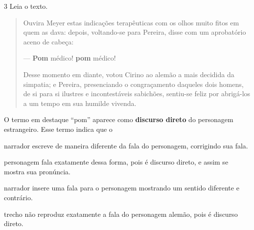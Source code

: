 \num{3} Leia o texto.

\begin{quote}
Ouvira Meyer estas indicações terapêuticas com os olhos muito fitos em
quem as dava: depois, voltando-se para Pereira, disse com um aprobatório
aceno de cabeça:

--- \textbf{Pom} médico! \textbf{pom} médico!

Desse momento em diante, votou Cirino ao alemão a mais decidida da
simpatia; e Pereira, presenciando o congraçamento daqueles dois homens,
de si para si ilustres e incontestáveis sabichões, sentiu-se feliz por
abrigá-los a um tempo em sua humilde vivenda.

\end{quote}

O termo em destaque “pom” aparece como \textbf{discurso direto} do
personagem estrangeiro. Esse termo indica que o

\begin{escolha}
\item narrador escreve de maneira diferente da fala do personagem,
corrigindo sua fala.

\item personagem fala exatamente dessa forma, pois é discurso direto,
e assim se mostra sua pronúncia.

\item narrador insere uma fala para o personagem mostrando um sentido
diferente e contrário.

\item trecho não reproduz exatamente a fala do personagem alemão,
pois é discurso direto.
\end{escolha}


